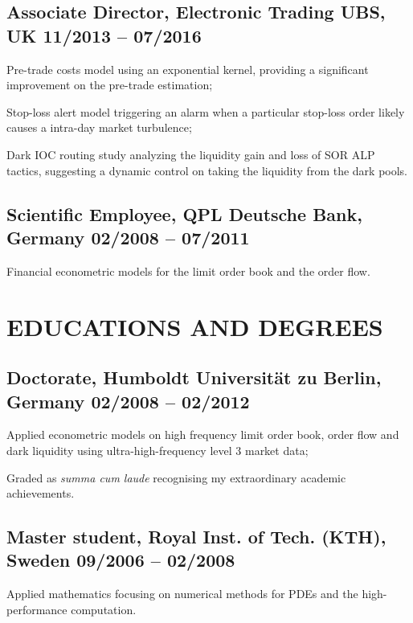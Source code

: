 \documentclass[a4paper,10pt]{article}
\begin{document}
\subsection{Associate Director,  Electronic Trading UBS, UK \hfill 11/2013 -- 07/2016} 
\begin{idesc}
\item[Pre-trade costs model] using an exponential kernel, providing a significant improvement on the pre-trade estimation;  
\item[Stop-loss alert model] triggering an alarm when a particular stop-loss order likely causes a intra-day market turbulence;  
\item[Dark IOC routing study] analyzing the liquidity gain and loss of SOR ALP tactics, suggesting a dynamic control on taking the liquidity from the dark pools. 
\end{idesc}
\subsection{Scientific Employee,  QPL Deutsche Bank, Germany \hfill 02/2008 -- 07/2011} 
\begin{idesc}
\item[Financial econometric models] for the limit order book and the order flow.
\end{idesc}

\section{EDUCATIONS AND DEGREES}
\subsection{Doctorate, Humboldt Universit\"at zu Berlin, Germany \hfill 02/2008 -- 02/2012}
\begin{idesc}
\item[Applied econometric models] on high frequency limit order book, order flow and dark liquidity using ultra-high-frequency level 3 market data;
\item[Graded as \emph{summa cum laude}] recognising my extraordinary academic achievements.
\end{idesc}
\subsection{Master student, Royal Inst. of Tech. (KTH), Sweden \hfill 09/2006 -- 02/2008}
\begin{idesc}
\item[Applied mathematics] focusing on numerical methods for PDEs and the high-performance computation.
\end{idesc}
\end{document}
